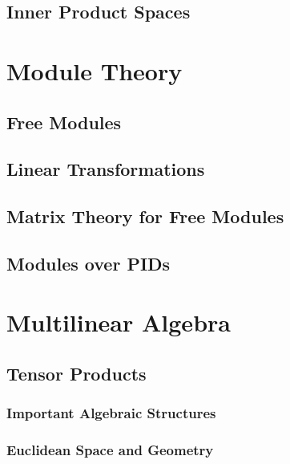 \documentclass[12pt]{report}
\begin{document}
\chapter{Inner Product Spaces}


\part{Module Theory}

\chapter{Free Modules}



\chapter{Linear Transformations}


\chapter{Matrix Theory for Free Modules}



\chapter{Modules over PIDs}



\part{Multilinear Algebra}


\chapter{Tensor Products}


\begin{appendices}
    \section{Important Algebraic Structures}
    
    
    \section{Euclidean Space and Geometry}
\end{appendices}
\end{document}
